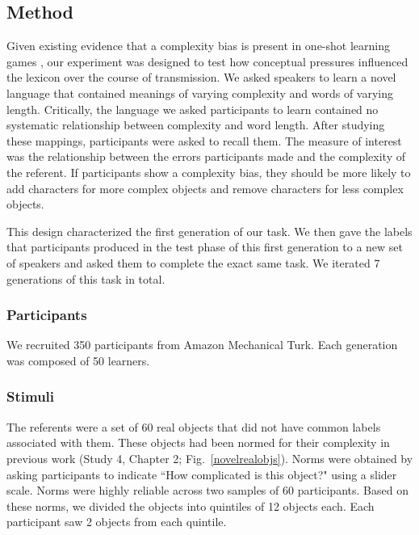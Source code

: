 \subsection{Method}

Given existing evidence that a complexity bias is present in one-shot learning games \cite{lewisstructure2014}, our experiment was designed to test how conceptual pressures influenced the lexicon over the course of transmission. We asked speakers to learn a novel language that contained meanings of varying complexity and words of varying length. Critically, the language we asked participants to learn contained no systematic relationship between complexity and word length. After studying these mappings, participants were asked to recall them. The measure of interest was the relationship between the errors participants made and the complexity of the referent. If participants show a complexity bias, they should be more likely to add characters for more complex objects and remove characters for less complex objects. 

This design characterized the first generation of our task. We then gave the labels that participants produced in the test phase of this first generation to a new set of speakers and asked them to complete the exact same task. We iterated 7 generations of this task in total.


\subsubsection{Participants} 

We recruited 350 participants from Amazon Mechanical Turk. Each generation was composed of 50 learners.

\subsubsection{Stimuli}

The referents were a set of 60 real objects that did not have common labels associated with them. These objects had been normed for their complexity in previous work (Study 4, Chapter 2; Fig.\ \ref{novelrealobjs}). Norms were obtained by asking participants to indicate ``How complicated is this object?" using a slider scale. Norms were highly reliable across two samples of 60 participants. Based on these norms, we divided the objects into quintiles of 12 objects each. Each participant saw 2 objects from each quintile. 





